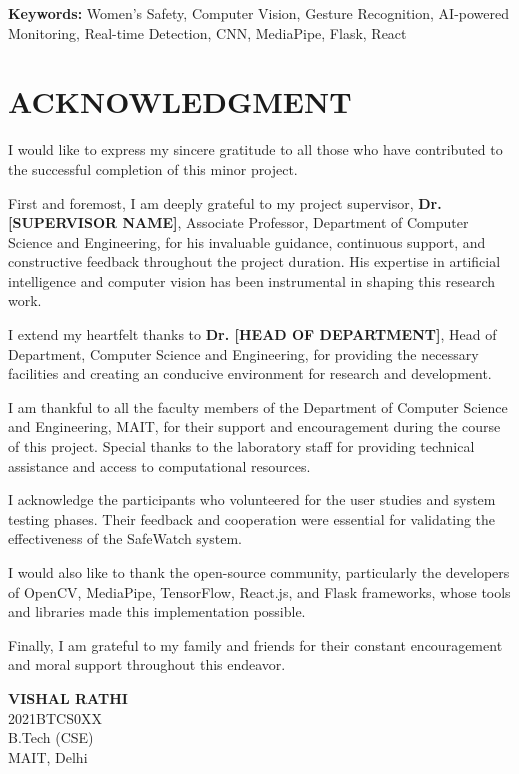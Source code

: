 \documentclass[12pt,a4paper]{article}
\begin{document}
\textbf{Keywords:} Women's Safety, Computer Vision, Gesture Recognition, AI-powered Monitoring, Real-time Detection, CNN, MediaPipe, Flask, React

\newpage

\section*{ACKNOWLEDGMENT}

I would like to express my sincere gratitude to all those who have contributed to the successful completion of this minor project.

First and foremost, I am deeply grateful to my project supervisor, \textbf{Dr. [SUPERVISOR NAME]}, Associate Professor, Department of Computer Science and Engineering, for his invaluable guidance, continuous support, and constructive feedback throughout the project duration. His expertise in artificial intelligence and computer vision has been instrumental in shaping this research work.

I extend my heartfelt thanks to \textbf{Dr. [HEAD OF DEPARTMENT]}, Head of Department, Computer Science and Engineering, for providing the necessary facilities and creating an conducive environment for research and development.

I am thankful to all the faculty members of the Department of Computer Science and Engineering, MAIT, for their support and encouragement during the course of this project. Special thanks to the laboratory staff for providing technical assistance and access to computational resources.

I acknowledge the participants who volunteered for the user studies and system testing phases. Their feedback and cooperation were essential for validating the effectiveness of the SafeWatch system.

I would also like to thank the open-source community, particularly the developers of OpenCV, MediaPipe, TensorFlow, React.js, and Flask frameworks, whose tools and libraries made this implementation possible.

Finally, I am grateful to my family and friends for their constant encouragement and moral support throughout this endeavor.

\vspace{1cm}

\begin{flushright}
\textbf{VISHAL RATHI}\\
2021BTCS0XX\\
B.Tech (CSE)\\
MAIT, Delhi
\end{flushright}
\end{document}
